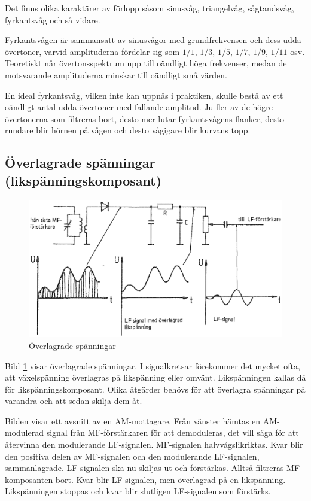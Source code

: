 Det finns olika karaktärer av förlopp såsom sinusvåg, triangelvåg, sågtandsvåg,
fyrkantsvåg och så vidare.

Fyrkantsvågen är sammansatt av sinusvågor med grundfrekvensen och dess udda
övertoner, varvid amplituderna fördelar sig som \(1/1\), \(1/3\), \(1/5\),
\(1/7\), \(1/9\), \(1/11\) osv.
Teoretiskt når övertonsspektrum upp till oändligt höga frekvenser, medan de
motsvarande amplituderna minskar till oändligt små värden.

En ideal fyrkantsvåg, vilken inte kan uppnås i praktiken, skulle bestå av ett
oändligt antal udda övertoner med fallande amplitud.
Ju fler av de högre övertonerna som filtreras bort, desto mer lutar
fyrkantsvågens flanker, desto rundare blir hörnen på vågen och desto vågigare
blir kurvans topp.

\subsection{Överlagrade spänningar
(likspänningskomposant)}

\begin{figure}[ht]
\includegraphics[width=\textwidth]{images/cropped_pdfs/bild_2_1-21.pdf}
\caption{Överlagrade spänningar}
\label{fig:BildII1-21}
\end{figure}

Bild \ref{fig:BildII1-21} visar överlagrade spänningar.
I signalkretsar förekommer det mycket ofta, att växelspänning överlagras på
likspänning eller omvänt.
Likspänningen kallas då för likspänningskomposant.
Olika åtgärder behövs för att överlagra spänningar på varandra och att sedan
skilja dem åt.

Bilden visar ett avsnitt av en AM-mottagare.
Från vänster hämtas en AM-modulerad signal från MF-förstärkaren för att
demoduleras, det vill säga för att återvinna den modulerande LF-signalen.
MF-signalen halvvågslikriktas.
Kvar blir den positiva delen av MF-signalen och den modulerande LF-signalen,
sammanlagrade.
LF-signalen ska nu skiljas ut och förstärkas.
Alltså filtreras MF-komposanten bort.
Kvar blir LF-signalen, men överlagrad på en likspänning.
Likspänningen stoppas och kvar blir slutligen LF-signalen som förstärks.

